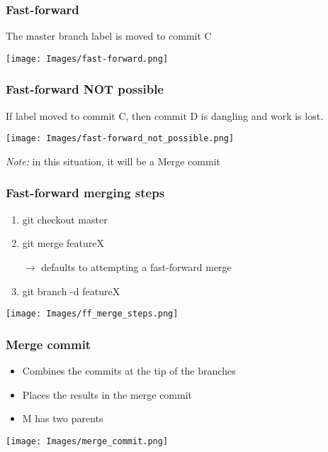 \documentclass{beamer}
\begin{document}
	\begin{frame}[plain]
		\frametitle{Fast-forward}
		
		The master branch label is moved to commit C
		\begin{center}
			\texttt{[image: Images/fast-forward.png]}
		\end{center}
	\end{frame}

	\begin{frame}[plain]
		\frametitle{Fast-forward NOT possible}
		
		If label moved to commit C, then commit D is dangling and work is lost.
		\begin{center}
			\texttt{[image: Images/fast-forward\_not\_possible.png]}
		\end{center}
		
		\textit{Note:} in this situation, it will be a Merge commit
	\end{frame}

	\begin{frame}[plain]
		\frametitle{Fast-forward merging steps}
		
		\begin{enumerate}
			\item git checkout master
			\item git merge featureX
				\begin{center}
					$\rightarrow$ defaults to attempting a fast-forward merge
				\end{center}
			\item git branch -d featureX
		\end{enumerate}

		\begin{center}
			\texttt{[image: Images/ff\_merge\_steps.png]}
		\end{center}
	\end{frame}

	\begin{frame}[plain]
		\frametitle{Merge commit}
		
		\begin{itemize}
			\item Combines the commits at the tip of the branches
			\item Places the results in the merge commit
			\item M has two parents
		\end{itemize}
		
		\begin{center}
			\texttt{[image: Images/merge\_commit.png]}
		\end{center}
	
	\end{frame}
\end{document}
